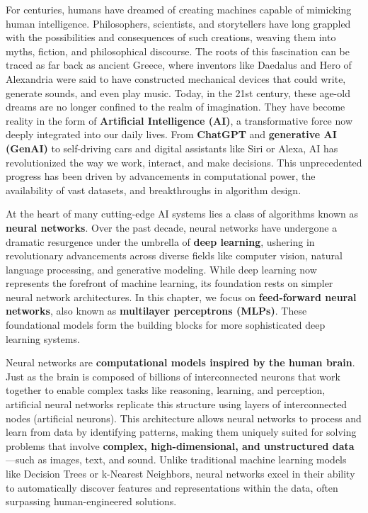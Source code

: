 \documentclass[
]{book}
\theoremstyle{definition}
\theoremstyle{definition}
\theoremstyle{definition}
\theoremstyle{definition}
\theoremstyle{remark}
\begin{document}
For centuries, humans have dreamed of creating machines capable of mimicking human intelligence. Philosophers, scientists, and storytellers have long grappled with the possibilities and consequences of such creations, weaving them into myths, fiction, and philosophical discourse. The roots of this fascination can be traced as far back as ancient Greece, where inventors like Daedalus and Hero of Alexandria were said to have constructed mechanical devices that could write, generate sounds, and even play music. Today, in the 21st century, these age-old dreams are no longer confined to the realm of imagination. They have become reality in the form of \textbf{Artificial Intelligence (AI)}, a transformative force now deeply integrated into our daily lives. From \textbf{ChatGPT} and \textbf{generative AI (GenAI)} to self-driving cars and digital assistants like Siri or Alexa, AI has revolutionized the way we work, interact, and make decisions. This unprecedented progress has been driven by advancements in computational power, the availability of vast datasets, and breakthroughs in algorithm design.

At the heart of many cutting-edge AI systems lies a class of algorithms known as \textbf{neural networks}. Over the past decade, neural networks have undergone a dramatic resurgence under the umbrella of \textbf{deep learning}, ushering in revolutionary advancements across diverse fields like computer vision, natural language processing, and generative modeling. While deep learning now represents the forefront of machine learning, its foundation rests on simpler neural network architectures. In this chapter, we focus on \textbf{feed-forward neural networks}, also known as \textbf{multilayer perceptrons (MLPs)}. These foundational models form the building blocks for more sophisticated deep learning systems.

Neural networks are \textbf{computational models inspired by the human brain}. Just as the brain is composed of billions of interconnected neurons that work together to enable complex tasks like reasoning, learning, and perception, artificial neural networks replicate this structure using layers of interconnected nodes (artificial neurons). This architecture allows neural networks to process and learn from data by identifying patterns, making them uniquely suited for solving problems that involve \textbf{complex, high-dimensional, and unstructured data}---such as images, text, and sound. Unlike traditional machine learning models like Decision Trees or k-Nearest Neighbors, neural networks excel in their ability to automatically discover features and representations within the data, often surpassing human-engineered solutions.
\end{document}
